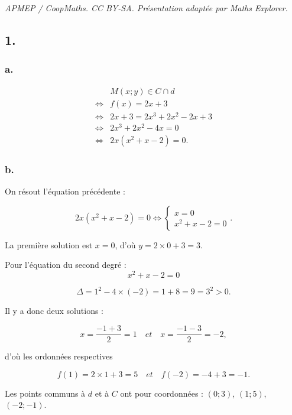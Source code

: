 \documentclass[10pt]{article}
\begin{document}
\noindent\textit{APMEP / CoopMaths. CC BY-SA. Présentation adaptée par Maths Explorer.}\par\medskip
\subsection*{1.}
	
	\subsubsection*{a.}
	
	\begin{align*}
&M(x ; y) \in C \cap d \\
\iff& f(x)=2x+3\\
\iff&  2x + 3 = 2x^3 + 2x^2 - 2x + 3 \\
\iff& 2x^3 + 2x^2 - 4x = 0 \\
\iff& 2x (x^2 + x - 2) = 0.
	\end{align*}
	
	\subsubsection*{b.}
	
	On résout l’équation précédente :
	
	\[
	2x (x^2 + x - 2) =0 \iff
	\begin{cases}
		x = 0 \\
		x^2 + x - 2 = 0
	\end{cases}.
	\]
	
	La première solution est \(x = 0\), d’où \(y = 2 \times 0 + 3 = 3\).
	
	Pour l’équation du second degré :
	\[
	x^2 + x - 2 = 0
	\]
	
	\[
	\Delta = 1^2 - 4 \times (-2) = 1 + 8 = 9 = 3^2 > 0.
	\]
	
	Il y a donc deux solutions :
	
	\[
	x = \dfrac{-1 + 3}{2} = 1 \quad et \quad x = \dfrac{-1 - 3}{2} = -2,
	\]
	
	d’où les ordonnées respectives
	
	\[
	f(1) = 2 \times 1 + 3 = 5 \quad et \quad f(-2) = -4 + 3 = -1.
	\]
	
	Les points communs à \(d\) et à \(C\) ont pour coordonnées : 	\((0 ; 3)\), \((1 ; 5)\), \((-2 ; -1)\).
	
\end{document}
